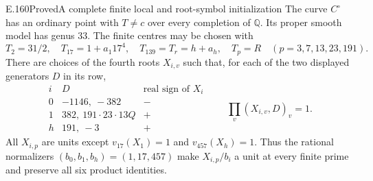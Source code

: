 \begin{result}{E.160}{Proved}{A complete finite local and root-symbol initialization}
The curve $C^\circ$ has an ordinary point with $T\ne c$ over every
completion of $\mathbb Q$.  Its proper smooth model has genus $33$.
The finite centres may be chosen with
\[
 T_2=31/2,\quad T_{17}=1+a_1 17^4,\quad
 T_{139}=T_r=h+a_h,\quad
 T_p=R\quad(p=3,7,13,23,191).
\tag{E.160.2}
\]
There are choices of the fourth roots $X_{i,v}$ such that, for each
of the two displayed generators $D$ in its row,
\[
\begin{array}{c|c|c}
 i& D&\text{real sign of }X_i\\ \hline
 0&-1146,\ -382&-\\
 1&382,\ 191\cdot23\cdot13Q&+\\
 h&191,\ -3&+
\end{array}
\qquad
 \prod_v(X_{i,v},D)_v=1.
\tag{E.160.3}
\]
All $X_{i,p}$ are units except $v_{17}(X_1)=1$ and
$v_{457}(X_h)=1$.  Thus the rational normalizers
$(b_0,b_1,b_h)=(1,17,457)$ make $X_{i,p}/b_i$ a unit at every
finite prime and preserve all six product identities.
\end{result}
